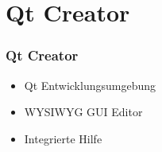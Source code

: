 \documentclass{beamer}
\begin{document}
\section{Qt Creator}
\begin{frame}[<+->]
	\frametitle{Qt Creator}
	\begin{itemize}
		\item Qt Entwicklungsumgebung
		\item WYSIWYG GUI Editor
		\item Integrierte Hilfe
	\end{itemize}
\end{frame}
\end{document}
